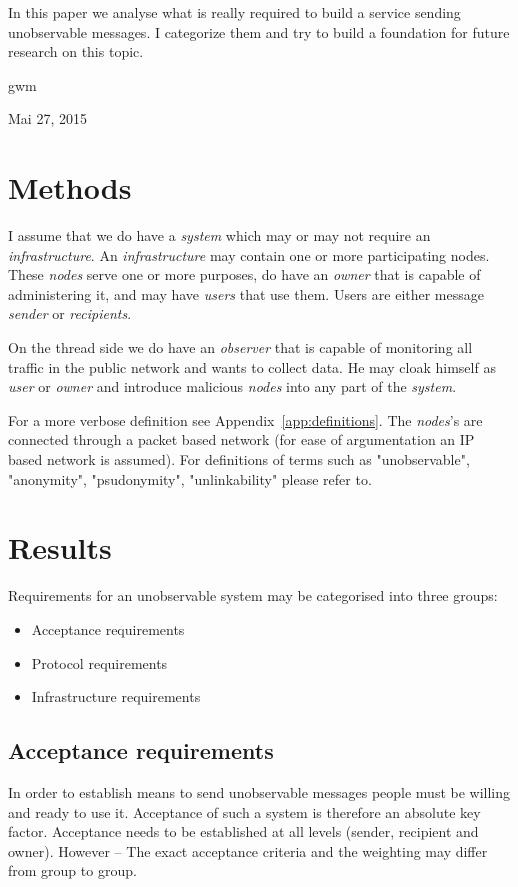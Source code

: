 \documentclass[12pt,journal,compsoc]{IEEEtran}
\begin{document}
In this paper we analyse what is really required to build a service sending unobservable messages. I categorize them and try to build a foundation for future research on this topic.
\par
\ifCLASSOPTIONpeerreview
\else
\hfill gwm
 
\hfill Mai 27, 2015
\fi

\section{Methods}
I assume that we do have a \emph{system} which may or may not require an \emph{infrastructure}. An \emph{infrastructure} may contain one or more participating {nodes}. These \emph{nodes} serve one or more purposes, do have an \emph{owner} that is capable of administering it, and may have \emph{users} that use them. Users are either message \emph{sender} or \emph{recipients}.
\par
On the thread side we do have an \emph{observer} that is capable of monitoring all traffic in the public network and wants to collect data. He may cloak himself as \emph{user} or \emph{owner} and introduce malicious \emph{nodes} into any part of the \emph{system}.
\par
For a more verbose definition see Appendix~\ref{app:definitions}. The \emph{nodes}'s are connected through a packet based network (for ease of argumentation an IP based network is assumed). For definitions of terms such as "unobservable", "anonymity", "psudonymity", "unlinkability" please refer to\cite{pfitzmann2010terminology}.


\section{Results}
Requirements for an unobservable system may be categorised into three groups:
\begin{itemize}
	\item Acceptance requirements
	\item Protocol requirements
	\item Infrastructure requirements
\end{itemize}

\subsection{Acceptance requirements}
In order to establish means to send unobservable messages people must be willing and ready to use it. Acceptance of such a system is therefore an absolute key factor. Acceptance needs to be established at all levels (sender, recipient and owner). However -- The exact acceptance criteria and the weighting may differ from group to group.
\end{document}
